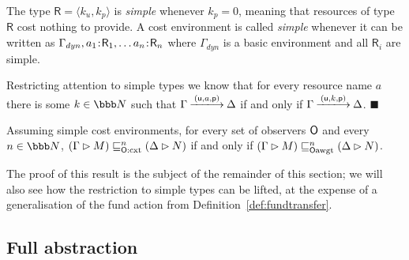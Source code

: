 \documentclass{LMCS}
\newcommand{\with}{\mathbin \rhd}
\newcommand{\cancom}[3]{({\ownfnt{#1}},{#2},{\ownfnt{#3}}) \xspace}
\newcommand{\nats}{\ensuremath{\bbb N}\xspace}
\newcommand{\ownO}{ {\ownfnt O}}
\newcommand{\Obscxtequiv}[2]{\mathrel{\sqsubseteq_{#1:\rm cxt}^{#2}}}
\newcommand{\Ocxtequiv}[1]{\Obscxtequiv{\ownO}{#1}}
\newcommand{\Obsaamort}[2]{\mathrel{\sqsubseteq_{\rm #1 awgt}^{#2}}}
\newcommand{\Oaamort}[1]{\Obsaamort{\ownO}{ #1}}
\newcommand{\Gammadyn}{\Gamma_{\scriptstyle dyn}}
\def\pair(#1,#2){\langle #1 , #2 \rangle}\newcommand{\parrow}{ \mathbin{\rightharpoonup}}
\newcommand{\typeletter}[1]{{\mathsf{#1}}}
\newcommand{\tR}{\typeletter{R}}
\newcommand{\calC}{\mathcal{C}}
\newcommand{\calD}{\mathcal{D}}
\newcommand{\Cassoc}[2]{ {{#1}\kern -0.2em : \kern -0.2em {#2}}}
\newcommand{\ar}[1]{\mathbin{\xlongrightarrow{ #1}}}
\newcommand{\leaveout}[1]{ }
\newcommand{\EndDefBox}{\null\hfill$\blacksquare$}
\newcommand{\boxHere}{\global\let\EndProof\empty\EndDefBox}
\begin{document}
\begin{defi} \label{def:simpletypes}
The type $\tR = \pair(k_u,k_p)$ is \emph{simple} whenever $k_p =0$, 
meaning that resources of type $\tR$ cost nothing to provide. 
A cost environment is called \emph{simple} whenever it can be written as
$\Gammadyn, \Cassoc{a_1}{\tR_1},\ldots \Cassoc{a_n}{\tR_n}$ where $\Gammadyn$ is
a basic environment and all $\tR_i$ are simple. 

Restricting attention to simple types we know that for every resource name
$a$  there is some $k \in \nats$ such that 
$\Gamma \ar{\cancom{u}{a}{p}} \Delta$ if and only if 
$\Gamma \ar{\cancom{u}{k}{p}} \Delta$.
\boxHere
\end{defi}

\begin{thm}\label{thm:fa} Assuming simple cost environments, for every 
set of observers $\ownO$ and 
every $n \in \nats$,  $(\Gamma \with M) \Ocxtequiv{n} (\Delta \with N)$ if and only if 
  $(\Gamma \with M) \Oaamort{n} (\Delta \with N)$. 
\end{thm}
The proof of this result is the subject of the remainder of this section; we will
also see how the restriction to simple types can be lifted, at the expense of a
generalisation of the  fund action  from  Definition~\ref{def:fundtransfer}.

\leaveout{
Before embarking on the proof of Theorem~\ref{thm:fa} we should point out that it has
Proposition~\ref{prop:own1} 
as a direct corollary. For example, using the notation of that proposition, it is simple to
prove that 
\begin{math}
  \calC \Obsaamort{\ownO_1}{n} \calD
\end{math}
if and only if
\begin{math}
  \calC \Obsaamort{\ownO_2}{n} \calD
\end{math}
because every $\ownO_1$-action is a $\ownO_2$-action and vice-versa. 
Similar reasoning gives Theorem~\ref{thm:externalfa} as a corollary.
}

\subsection{Full abstraction}\label{sec:fa}
\end{document}
